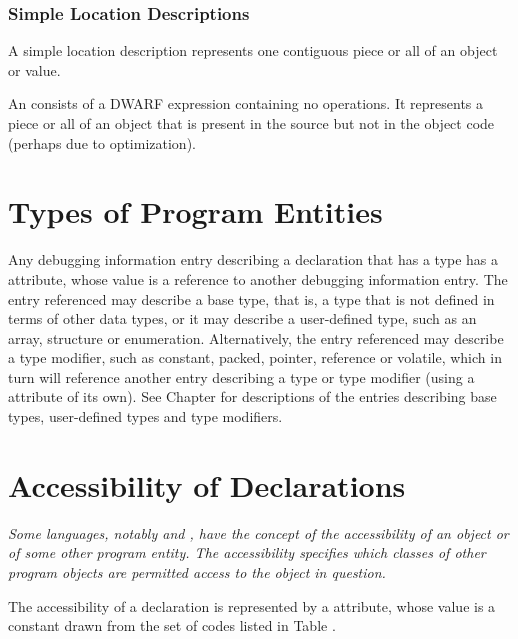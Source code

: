 \subsubsection{Simple Location Descriptions}
\label{chap:simplelocationdesriptions}
A 
simple location description
\bb
represents
\eb
one contiguous piece or all of an object or value.

\label{chap:emptylocationdescriptions}
An 
consists of a DWARF expression
containing no operations. It represents a piece or all of an
object that is present in the source but not in the object code
(perhaps due to optimization).




\section{Types of Program Entities}
\label{chap:typesofprogramentities}
\hypertarget{chap:DWATtypetypeofdeclaration}{}
Any debugging information entry describing a declaration that
has a type has
a \DWATtypeDEFN{} attribute, whose value is a
reference to another debugging information entry. The entry
referenced may describe a base type, that is, a type that is
not defined in terms of other data types, or it may describe a
user-defined type, such as an array, structure or enumeration.
Alternatively, the entry referenced may describe a type
modifier, such as constant, packed, pointer, reference or
volatile, which in turn will reference another entry describing
a type or type modifier (using a
\DWATtypeNAME{} attribute of its
own). See Chapter 
for descriptions of the entries describing
base types, user-defined types and type modifiers.


\section{Accessibility of Declarations}
\label{chap:accessibilityofdeclarations}
\textit{Some languages, notably  and
, have the concept of
the accessibility of an object or of some other program
entity. The accessibility specifies which classes of other
program objects are permitted access to the object in question.}

The accessibility of a declaration
is\hypertarget{chap:DWATaccessibilityattribute}{}
represented by a
\DWATaccessibilityDEFN{}
attribute, whose value is a constant drawn from the set of codes
listed in Table .

